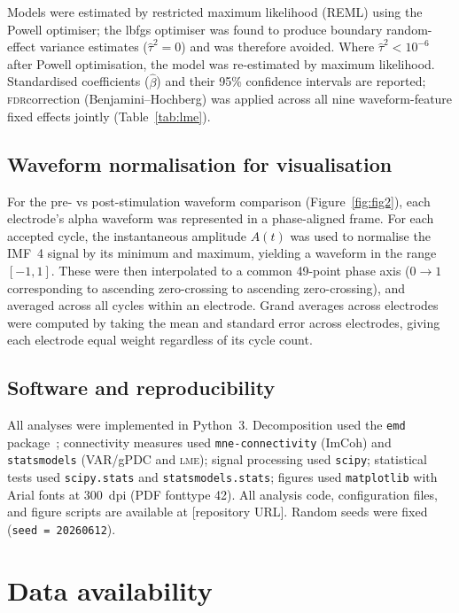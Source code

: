 \documentclass[11pt, a4paper]{article}
\newcommand{\fdr}{\textsc{fdr}}
\newcommand{\lme}{\textsc{lme}}
\begin{document}
Models were estimated by restricted maximum likelihood (REML) using the
Powell optimiser; the lbfgs optimiser was found to produce boundary
random-effect variance estimates ($\hat{\tau}^2 = 0$) and was therefore
avoided. Where $\hat{\tau}^2 < 10^{-6}$ after Powell optimisation,
the model was re-estimated by maximum likelihood. Standardised
coefficients ($\hat{\beta}$) and their 95\% confidence intervals are
reported; \fdr correction (Benjamini--Hochberg) was applied across all
nine waveform-feature fixed effects jointly (Table~\ref{tab:lme}).

\subsection{Waveform normalisation for visualisation}

For the pre- vs post-stimulation waveform comparison (Figure~\ref{fig:fig2}),
each electrode's alpha waveform was represented in a phase-aligned frame.
For each accepted cycle, the instantaneous amplitude $A(t)$ was used to
normalise the IMF~4 signal by its minimum and maximum, yielding a waveform
in the range $[-1, 1]$. These were then interpolated to a common 49-point
phase axis ($0 \to 1$ corresponding to ascending zero-crossing to ascending
zero-crossing), and averaged across all cycles within an electrode. Grand
averages across electrodes were computed by taking the mean and standard
error across electrodes, giving each electrode equal weight regardless of its
cycle count.

\subsection{Software and reproducibility}

All analyses were implemented in Python~3. Decomposition used the
\texttt{emd} package~\citep{quinn2021within}; connectivity measures used
\texttt{mne-connectivity} (ImCoh) and \texttt{statsmodels} (VAR/gPDC and
\lme); signal processing used \texttt{scipy}; statistical tests used
\texttt{scipy.stats} and \texttt{statsmodels.stats}; figures used
\texttt{matplotlib} with Arial fonts at 300~dpi (PDF fonttype 42).
All analysis code, configuration files, and figure scripts are available
at [repository URL]. Random seeds were fixed (\texttt{seed = 20260612}).

\section*{Data availability}
\end{document}
